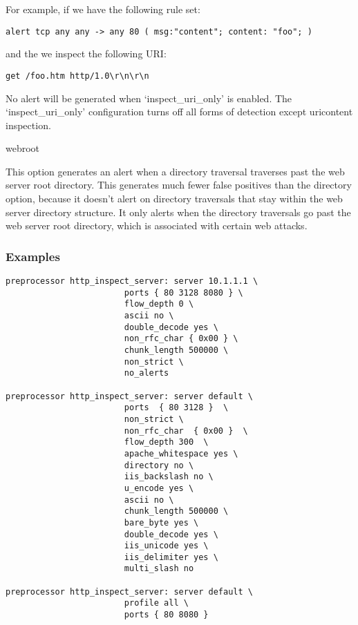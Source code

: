 \documentclass[english]{report}
\newcounter{slistnum}
\newenvironment{slist}
{ \begin{list}{ {\bf \arabic{slistnum}.} }{\usecounter{slistnum} } }
{ \end{list} }
\begin{document}
\begin{slist}
For example, if we have the following rule set:

\begin{verbatim}
alert tcp any any -> any 80 ( msg:"content"; content: "foo"; )
\end{verbatim}

and the we inspect the following URI:
\begin{verbatim}
get /foo.htm http/1.0\r\n\r\n
\end{verbatim}

No alert will be generated when `inspect\_uri\_only' is enabled.  The
`inspect\_uri\_only' configuration turns off all forms of detection except
uricontent inspection.

\item webroot

This option generates an alert when a directory traversal traverses past
the web server root directory.  This generates much fewer false positives than
the directory option, because it doesn't alert on directory traversals that
stay within the web server directory structure.  It only alerts when the
directory traversals go past the web server root directory, which
is associated with certain web attacks.

\end{slist}

\subsubsection{Examples}

\begin{verbatim}
preprocessor http_inspect_server: server 10.1.1.1 \
                        ports { 80 3128 8080 } \
                        flow_depth 0 \
                        ascii no \
                        double_decode yes \
                        non_rfc_char { 0x00 } \
                        chunk_length 500000 \
                        non_strict \
                        no_alerts

preprocessor http_inspect_server: server default \ 
                        ports  { 80 3128 }  \
                        non_strict \
                        non_rfc_char  { 0x00 }  \
                        flow_depth 300  \
                        apache_whitespace yes \
                        directory no \
                        iis_backslash no \
                        u_encode yes \
                        ascii no \
                        chunk_length 500000 \
                        bare_byte yes \
                        double_decode yes \
                        iis_unicode yes \ 
                        iis_delimiter yes \
                        multi_slash no

preprocessor http_inspect_server: server default \
                        profile all \
                        ports { 80 8080 }
\end{verbatim}
\end{document}
